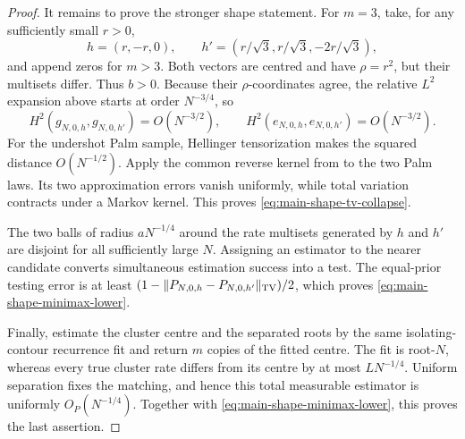 \begin{proof}
It remains to prove the stronger shape statement.  For \(m=3\), take, for
any sufficiently small \(r>0\),
\begin{equation}
 h=(r,-r,0),\qquad
 h'=(r/\sqrt3,r/\sqrt3,-2r/\sqrt3),
\label{eq:main-equal-dispersion-shapes}
\end{equation}
and append zeros for \(m>3\).  Both vectors are centred and have
\(\rho=r^2\), but their multisets differ.  Thus \(b>0\).
Because their \(\rho\)-coordinates agree, the relative \(L^2\) expansion
above starts at order \(N^{-3/4}\), so
\begin{equation}
 H^2(g_{N,0,h},g_{N,0,h'})=O(N^{-3/2}),\qquad
 H^2(e_{N,0,h},e_{N,0,h'})=O(N^{-3/2}).
\label{eq:main-equal-dispersion-hellinger}
\end{equation}
For the undershot Palm sample, Hellinger tensorization makes the squared
distance \(O(N^{-1/2})\).  Apply the common reverse kernel from
 to the two Palm laws.
Its two approximation errors vanish uniformly, while total variation
contracts under a Markov kernel.  This proves
\eqref{eq:main-shape-tv-collapse}.

The two balls of radius \(aN^{-1/4}\) around the rate multisets generated by
\(h\) and \(h'\) are disjoint for all sufficiently large \(N\).  Assigning
an estimator to the nearer candidate converts simultaneous estimation
success into a test.  The equal-prior testing error is at least
\((1-\|P_{N,0,h}-P_{N,0,h'}\|_{\rm TV})/2\), which proves
\eqref{eq:main-shape-minimax-lower}.

Finally, estimate the cluster centre and the separated roots by the same
isolating-contour recurrence fit and return \(m\) copies of the fitted
centre.  The fit is root-\(N\), whereas every true cluster rate differs from
its centre by at most \(LN^{-1/4}\).  Uniform separation fixes the matching,
and hence this total measurable estimator is uniformly
\(O_P(N^{-1/4})\).  Together with
\eqref{eq:main-shape-minimax-lower}, this proves the last assertion.
\end{proof}

